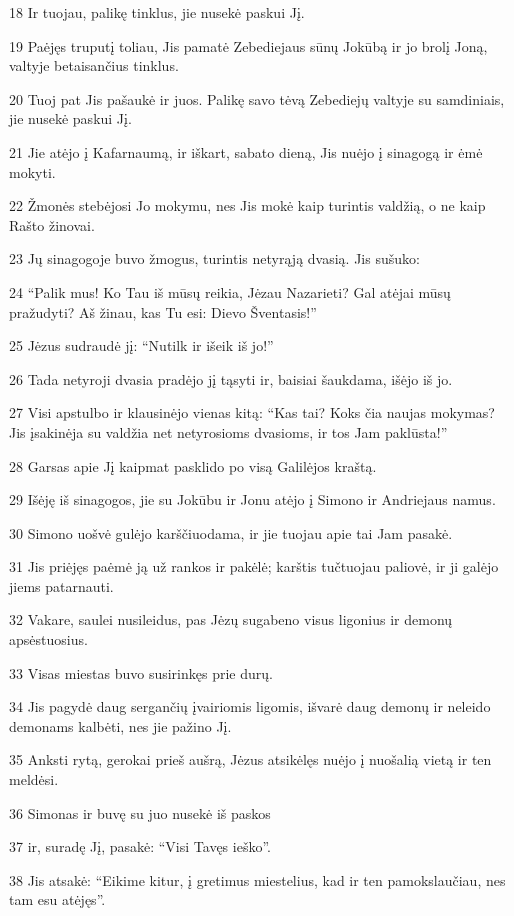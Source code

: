 \par 18 Ir tuojau, palikę tinklus, jie nusekė paskui Jį. 
\par 19 Paėjęs truputį toliau, Jis pamatė Zebediejaus sūnų Jokūbą ir jo brolį Joną, valtyje betaisančius tinklus. 
\par 20 Tuoj pat Jis pašaukė ir juos. Palikę savo tėvą Zebediejų valtyje su samdiniais, jie nusekė paskui Jį. 
\par 21 Jie atėjo į Kafarnaumą, ir iškart, sabato dieną, Jis nuėjo į sinagogą ir ėmė mokyti. 
\par 22 Žmonės stebėjosi Jo mokymu, nes Jis mokė kaip turintis valdžią, o ne kaip Rašto žinovai. 
\par 23 Jų sinagogoje buvo žmogus, turintis netyrąją dvasią. Jis sušuko: 
\par 24 “Palik mus! Ko Tau iš mūsų reikia, Jėzau Nazarieti? Gal atėjai mūsų pražudyti? Aš žinau, kas Tu esi: Dievo Šventasis!” 
\par 25 Jėzus sudraudė jį: “Nutilk ir išeik iš jo!” 
\par 26 Tada netyroji dvasia pradėjo jį tąsyti ir, baisiai šaukdama, išėjo iš jo. 
\par 27 Visi apstulbo ir klausinėjo vienas kitą: “Kas tai? Koks čia naujas mokymas? Jis įsakinėja su valdžia net netyrosioms dvasioms, ir tos Jam paklūsta!” 
\par 28 Garsas apie Jį kaipmat pasklido po visą Galilėjos kraštą. 
\par 29 Išėję iš sinagogos, jie su Jokūbu ir Jonu atėjo į Simono ir Andriejaus namus. 
\par 30 Simono uošvė gulėjo karščiuodama, ir jie tuojau apie tai Jam pasakė. 
\par 31 Jis priėjęs paėmė ją už rankos ir pakėlė; karštis tučtuojau paliovė, ir ji galėjo jiems patarnauti. 
\par 32 Vakare, saulei nusileidus, pas Jėzų sugabeno visus ligonius ir demonų apsėstuosius. 
\par 33 Visas miestas buvo susirinkęs prie durų. 
\par 34 Jis pagydė daug sergančių įvairiomis ligomis, išvarė daug demonų ir neleido demonams kalbėti, nes jie pažino Jį. 
\par 35 Anksti rytą, gerokai prieš aušrą, Jėzus atsikėlęs nuėjo į nuošalią vietą ir ten meldėsi. 
\par 36 Simonas ir buvę su juo nusekė iš paskos 
\par 37 ir, suradę Jį, pasakė: “Visi Tavęs ieško”. 
\par 38 Jis atsakė: “Eikime kitur, į gretimus miestelius, kad ir ten pamokslaučiau, nes tam esu atėjęs”. 
